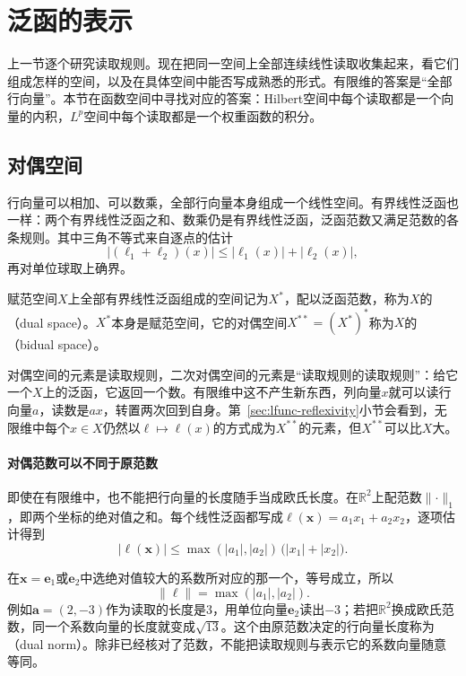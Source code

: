 \section{泛函的表示}
\label{sec:lfunc-representation}

上一节逐个研究读取规则。现在把同一空间上全部连续线性读取收集起来，看它们组成怎样的空间，以及在具体空间中能否写成熟悉的形式。有限维的答案是“全部行向量”。本节在函数空间中寻找对应的答案：Hilbert空间中每个读取都是一个向量的内积，$L^p$空间中每个读取都是一个权重函数的积分。

\subsection{对偶空间}
\label{sec:lfunc-dual-space}

行向量可以相加、可以数乘，全部行向量本身组成一个线性空间。有界线性泛函也一样：两个有界线性泛函之和、数乘仍是有界线性泛函，泛函范数又满足范数的各条规则。其中三角不等式来自逐点的估计
\[
\lvert(\ell_1+\ell_2)(x)\rvert\leq\lvert\ell_1(x)\rvert+\lvert\ell_2(x)\rvert ,
\]
再对单位球取上确界。

\begin{definition}[对偶空间与二次对偶空间]
\label{def:lfunc-dual-space}
赋范空间$X$上全部有界线性泛函组成的空间记为$X^*$，配以泛函范数，称为$X$的（dual space）。$X^*$本身是赋范空间，它的对偶空间$X^{**}=(X^*)^*$称为$X$的（bidual space）。
\end{definition}

对偶空间的元素是读取规则，二次对偶空间的元素是“读取规则的读取规则”：给它一个$X$上的泛函，它返回一个数。有限维中这不产生新东西，列向量$x$就可以读行向量$a$，读数是$ax$，转置两次回到自身。第~\ref{sec:lfunc-reflexivity}小节会看到，无限维中每个$x\in X$仍然以$\ell\mapsto\ell(x)$的方式成为$X^{**}$的元素，但$X^{**}$可以比$X$大。

\paragraph{对偶范数可以不同于原范数}
即使在有限维中，也不能把行向量的长度随手当成欧氏长度。在$\mathbb R^2$上配范数$\lVert\cdot\rVert_1$，即两个坐标的绝对值之和。每个线性泛函都写成$\ell(\bm x)=a_1x_1+a_2x_2$，逐项估计得到
\[
\lvert\ell(\bm x)\rvert\leq\max(\lvert a_1\rvert,\lvert a_2\rvert)\,\bigl(\lvert x_1\rvert+\lvert x_2\rvert\bigr).
\]

在$\bm x=\bm e_1$或$\bm e_2$中选绝对值较大的系数所对应的那一个，等号成立，所以
\[
\lVert\ell\rVert=\max(\lvert a_1\rvert,\lvert a_2\rvert).
\]
例如$\bm a=(2,-3)$作为读取的长度是$3$，用单位向量$\bm e_2$读出$-3$；若把$\mathbb R^2$换成欧氏范数，同一个系数向量的长度就变成$\sqrt{13}$。这个由原范数决定的行向量长度称为（dual norm）。除非已经核对了范数，不能把读取规则与表示它的系数向量随意等同。

